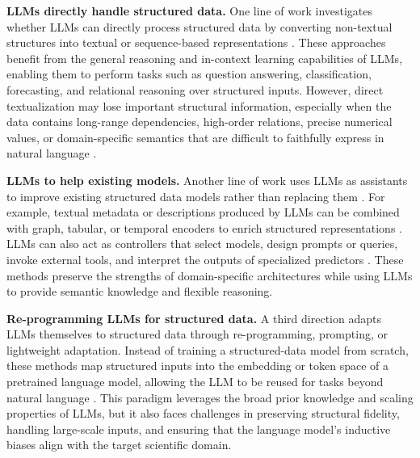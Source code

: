 \documentclass{llmxive}
\begin{document}
{\textbf{LLMs directly handle structured data.}
One line of work investigates whether LLMs can directly process structured data by converting non-textual structures into textual or sequence-based representations \cite{DBLP:conf/sigir/Tang00SSCY024, DBLP:journals/corr/abs-2506-11040, DBLP:journals/corr/abs-2601-23204, DBLP:journals/corr/abs-2407-12522, DBLP:conf/emnlp/JiangZDYZW23}. These approaches benefit from the general reasoning and in-context learning capabilities of LLMs, enabling them to perform tasks such as question answering, classification, forecasting, and relational reasoning over structured inputs. However, direct textualization may lose important structural information, especially when the data contains long-range dependencies, high-order relations, precise numerical values, or domain-specific semantics that are difficult to faithfully express in natural language \cite{DBLP:conf/wsdm/SuiZZH024, DBLP:journals/corr/abs-2507-13646, DBLP:journals/bmcbi/SadeghiBFLN24, DBLP:journals/corr/abs-2510-01538, DBLP:conf/emnlp/YangTXZLH25}.

\textbf{LLMs to help existing models.}
Another line of work uses LLMs as assistants to improve existing structured data models rather than replacing them \cite{DBLP:journals/tkde/JinLHJJH24, DBLP:journals/sigkdd/ChenMLJWWWYFLT23, DBLP:journals/corr/abs-2502-08942}. For example, textual metadata or descriptions produced by LLMs can be combined with graph, tabular, or temporal encoders to enrich structured representations \cite{DBLP:journals/corr/abs-2510-21131, DBLP:conf/nips/YanLLY0ZYZHSDZ023, DBLP:conf/acl/0006ZJFJBH025, DBLP:journals/corr/abs-2509-00687, DBLP:journals/corr/abs-2506-00009}. LLMs can also act as controllers that select models, design prompts or queries, invoke external tools, and interpret the outputs of specialized predictors \cite{DBLP:conf/icml/TriratJH25, DBLP:journals/tmlr/TornedeDEGMRSTT24, DBLP:conf/mm/LuoFN024}. These methods preserve the strengths of domain-specific architectures while using LLMs to provide semantic knowledge and flexible reasoning.

\textbf{Re-programming LLMs for structured data.}
A third direction adapts LLMs themselves to structured data through re-programming, prompting, or lightweight adaptation. Instead of training a structured-data model from scratch, these methods map structured inputs into the embedding or token space of a pretrained language model, allowing the LLM to be reused for tasks beyond natural language \cite{DBLP:conf/iclr/0005WMCZSCLLPW24, DBLP:journals/corr/abs-2402-05862, DBLP:journals/corr/abs-2502-13449, DBLP:journals/corr/abs-2409-03444}. 
This paradigm leverages the broad prior knowledge and scaling properties of LLMs, but it also faces challenges in preserving structural fidelity, handling large-scale inputs, and ensuring that the language model's inductive biases align with the target scientific domain.

}
\end{document}
